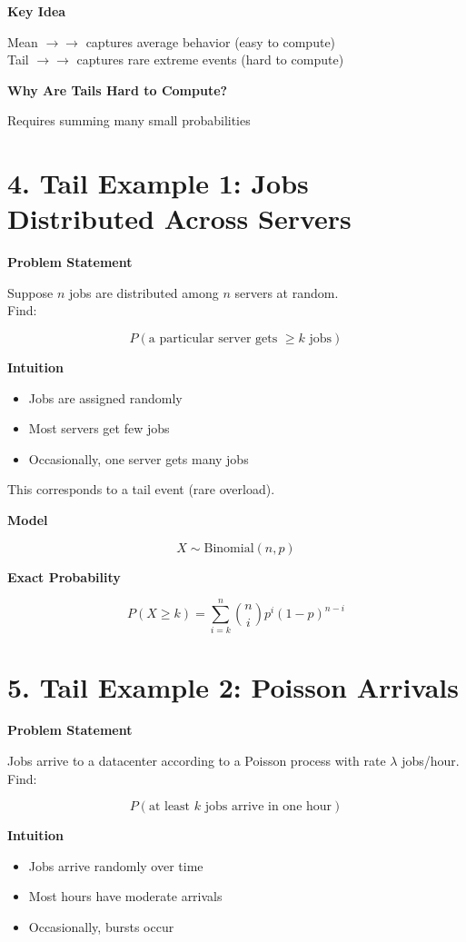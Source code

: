 \documentclass[12pt]{article}
\begin{document}
\textbf{Key Idea}

Mean $\rightarrow \rightarrow$ captures average behavior (easy to compute) \\
Tail $\rightarrow \rightarrow$ captures rare extreme events (hard to compute)

\textbf{Why Are Tails Hard to Compute?}

Requires summing many small probabilities

\section*{4. Tail Example 1: Jobs Distributed Across Servers}

\textbf{Problem Statement}

Suppose $n$ jobs are distributed among $n$ servers at random. \\
Find:

\[
P(\text{a particular server gets } \geq k \text{ jobs})
\]

\textbf{Intuition}

\begin{itemize}
\item Jobs are assigned randomly
\item Most servers get few jobs
\item Occasionally, one server gets many jobs
\end{itemize}

This corresponds to a tail event (rare overload).

\textbf{Model}

\[
X \sim \text{Binomial}(n,p)
\]

\textbf{Exact Probability}

\[
P(X \geq k) = \sum_{i=k}^{n} \binom{n}{i} p^i (1-p)^{n-i}
\]

\section*{5. Tail Example 2: Poisson Arrivals}

\textbf{Problem Statement}

Jobs arrive to a datacenter according to a Poisson process with rate $\lambda$ jobs/hour. \\
Find:

\[
P(\text{at least } k \text{ jobs arrive in one hour})
\]

\textbf{Intuition}

\begin{itemize}
\item Jobs arrive randomly over time
\item Most hours have moderate arrivals
\item Occasionally, bursts occur
\end{itemize}
\end{document}
